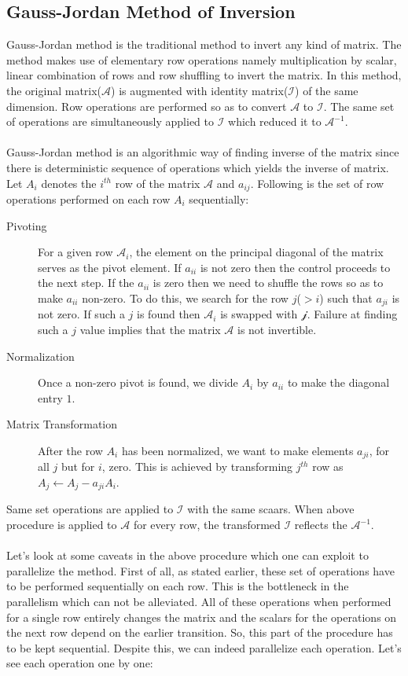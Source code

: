 \documentclass[11pt]{article}
\begin{document}
\subsection{Gauss-Jordan Method of Inversion}
Gauss-Jordan method is the traditional method to invert any kind of matrix. The method makes use of elementary row operations namely multiplication by scalar, linear combination of rows and row shuffling to invert the matrix. In this method, the original matrix($\mathcal{A}$) is augmented with identity matrix($\mathcal{I}$) of the same dimension. Row operations are performed so as to convert $\mathcal{A}$ to $\mathcal{I}$. The same set of operations are simultaneously applied to $\mathcal{I}$ which reduced it to $\mathcal{A}^{-1}$. \\\\
Gauss-Jordan method is an algorithmic way of finding inverse of the matrix since there is deterministic sequence of operations which yields the inverse of matrix. Let $A_i$ denotes the $i^{th}$ row of the matrix $\mathcal{A}$ and $a_{ij}$. Following is the set of row operations performed on each row $A_i$ sequentially:
\begin{description}
	\item[Pivoting] For a given row $\mathcal{A}_i$, the element on the principal diagonal of the matrix serves as the pivot element. If $a_{ii}$ is not zero then the control proceeds to the next step. If the $a_{ii}$ is zero then we need to shuffle the rows so as to make $a_{ii}$ non-zero. To do this, we search for the row $j$($> i$) such that $a_{ji}$ is not zero. If such a $j$ is found then $\mathcal{A}_{i}$ is swapped with $\mathcal{j}$. Failure at finding such a $j$ value implies that the matrix $\mathcal{A}$ is not invertible.
	\item[Normalization] Once a non-zero pivot is found, we divide $A_i$ by $a_{ii}$ to make the diagonal entry $1$.
	\item[Matrix Transformation] After the row $A_i$ has been normalized, we want to make elements $a_{ji}$, for all $j$ but for $i$, zero. This is achieved by transforming $j^{th}$ row as $A_j \leftarrow A_j - a_{ji}A_i$.
\end{description}
Same set operations are applied to $\mathcal{I}$ with the same scaars. When above procedure is applied to $\mathcal{A}$ for every row, the transformed $\mathcal{I}$ reflects the $\mathcal{A}^{-1}$.\\\\
Let's look at some caveats in the above procedure which one can exploit to parallelize the method. First of all, as stated earlier, these set of operations have to be performed sequentially on each row. This is the bottleneck in the parallelism which can not be alleviated. All of these operations when performed for a single row entirely changes the matrix and the scalars for the operations on the next row depend on the earlier transition. So, this part of the procedure has to be kept sequential. Despite this, we can indeed parallelize each operation. Let's see each operation one by one:
\end{document}
